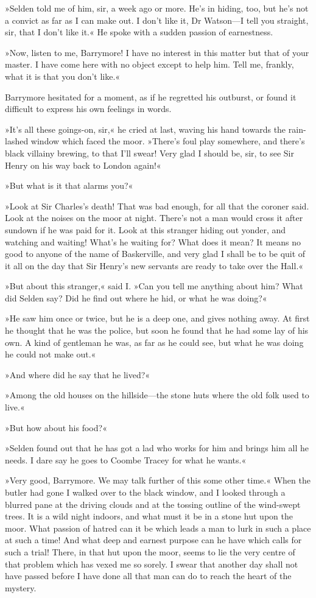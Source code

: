 »Selden told me of him, sir, a week ago or more. He's in hiding, too, but he's not a convict as far as I can make out. I don't like it, Dr Watson—I tell you straight, sir, that I don't like it.« He spoke with a sudden passion of earnestness.

»Now, listen to me, Barrymore! I have no interest in this matter but that of your master. I have come here with no object except to help him. Tell me, frankly, what it is that you don't like.«

Barrymore hesitated for a moment, as if he regretted his outburst, or found it difficult to express his own feelings in words.

»It's all these goings-on, sir,« he cried at last, waving his hand towards the rain-lashed window which faced the moor. »There's foul play somewhere, and there's black villainy brewing, to that I'll swear! Very glad I should be, sir, to see Sir Henry on his way back to London again!«

»But what is it that alarms you?«

»Look at Sir Charles's death! That was bad enough, for all that the coroner said. Look at the noises on the moor at night. There's not a man would cross it after sundown if he was paid for it. Look at this stranger hiding out yonder, and watching and waiting! What's he waiting for? What does it mean? It means no good to anyone of the name of Baskerville, and very glad I shall be to be quit of it all on the day that Sir Henry's new servants are ready to take over the Hall.«

»But about this stranger,« said I. »Can you tell me anything about him? What did Selden say? Did he find out where he hid, or what he was doing?«

»He saw him once or twice, but he is a deep one, and gives nothing away. At first he thought that he was the police, but soon he found that he had some lay of his own. A kind of gentleman he was, as far as he could see, but what he was doing he could not make out.«

»And where did he say that he lived?«

»Among the old houses on the hillside—the stone huts where the old folk used to live.«

»But how about his food?«

»Selden found out that he has got a lad who works for him and brings him all he needs. I dare say he goes to Coombe Tracey for what he wants.«

»Very good, Barrymore. We may talk further of this some other time.« When the butler had gone I walked over to the black window, and I looked through a blurred pane at the driving clouds and at the tossing outline of the wind-swept trees. It is a wild night indoors, and what must it be in a stone hut upon the moor. What passion of hatred can it be which leads a man to lurk in such a place at such a time! And what deep and earnest purpose can he have which calls for such a trial! There, in that hut upon the moor, seems to lie the very centre of that problem which has vexed me so sorely. I swear that another day shall not have passed before I have done all that man can do to reach the heart of the mystery.
